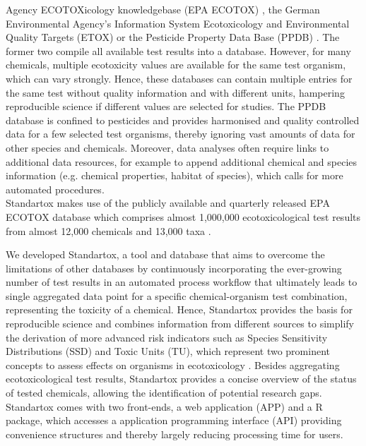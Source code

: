 Agency ECOTOXicology knowledgebase (EPA ECOTOX) \citep{elonen_ecotoxicology_2018}, the German Environmental Agency's Information System Ecotoxicology and Environmental Quality Targets (ETOX) \citep{umweltbundesamt_etox_2019} or the Pesticide Property Data Base (PPDB) \citep{lewis_international_2016}. The former two compile all available test results into a database. However, for many chemicals, multiple ecotoxicity values are available for the same test organism, which can vary strongly. Hence, these databases can contain multiple entries for the same test without quality information and with different units, hampering reproducible science if different values are selected for studies. The PPDB database is confined to pesticides and provides harmonised and quality controlled data for a few selected test organisms, thereby ignoring vast amounts of data for other species and chemicals. Moreover, data analyses often require links to additional data resources, for example to append additional chemical and species information (e.g. chemical properties, habitat of species), which calls for more automated procedures.\\

Standartox makes use of the publicly available and quarterly released EPA ECOTOX database which comprises almost 1,000,000 ecotoxicological test results from almost 12,000 chemicals and 13,000 taxa \citep{usepa_ecotox_2019}.


We developed Standartox, a tool and database that aims to overcome the limitations of other databases by continuously incorporating the ever-growing number of test results in an automated process workflow that ultimately leads to single aggregated data point for a specific chemical-organism test combination, representing the toxicity of a chemical. Hence, Standartox provides the basis for reproducible science and combines information from different sources to simplify the derivation of more advanced risk indicators such as Species Sensitivity Distributions (SSD) and Toxic Units (TU), which represent two prominent concepts to assess effects on organisms in ecotoxicology \citep{posthuma_species_2002, kefford_definition_2011, schafer_effects_2011}. Besides aggregating ecotoxicological test results, Standartox provides a concise overview of the status of tested chemicals, allowing the identification of potential research gaps. Standartox comes with two front-ends,  a web application (APP) and a R \citep{rcoreteam_language_2017} package, which accesses a application programming interface (API) providing convenience structures and thereby largely reducing processing time for users.

